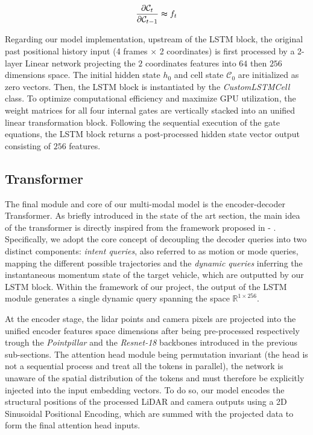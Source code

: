 \documentclass[conference]{IEEEtran}
\begin{document}
\begin{equation}
    \dfrac{\partial \mathcal{C}_t}{\partial \mathcal{C}_{t-1}} \thickapprox f_t
\end{equation}

 Regarding our model implementation, upstream of the LSTM block, the original past positional history input (4 frames $\times$ 2 coordinates) is first processed by a 2-layer Linear network projecting the $2$ coordinates features into $64$ then $256$ dimensions space. The initial hidden state $h_0$ and cell state $\mathcal{C}_0$ are initialized as zero vectors. Then, the LSTM block is instantiated by the \textit{CustomLSTMCell} class. To optimize computational efficiency and maximize GPU utilization, the weight matrices for all four internal gates are vertically stacked into an unified linear transformation block. Following the sequential execution of the gate equations, the LSTM block returns a post-processed hidden state vector output consisting of $256$ features.

\subsection{Transformer}

The final module and core of our multi-modal model is the encoder-decoder Transformer. As briefly introduced in the state of the art section, the main idea of the transformer is directly inspired from the framework proposed in  - \cite{zhang2024demodecouplingmotionforecasting}. Specifically, we adopt the core
concept of decoupling the decoder queries into  two distinct components: \textit{intent queries}, also referred to as motion or mode queries, mapping the different possible trajectories and the \textit{dynamic queries} inferring the instantaneous momentum state of the target vehicle, which are outputted by our LSTM block. Within the framework of our project, the output of the LSTM module generates a single dynamic query spanning the space $\mathbb{R}^{1\times 256}$. 

At the encoder stage, the lidar points and camera pixels are projected into the unified encoder features space dimensions after being pre-processed respectively trough the \textit{Pointpillar} and the \textit{Resnet-18} backbones introduced in the previous sub-sections. The attention head module being permutation invariant (the head is not a sequential process and treat all the tokens in parallel), the network is unaware of the spatial distribution of the tokens and must therefore
be explicitly injected into the input embedding vectors. To do so, our model encodes the structural positions of the
processed LiDAR and camera outputs using a 2D Sinusoidal Positional Encoding, which are summed with the projected data to form the final attention head inputs.
\end{document}
